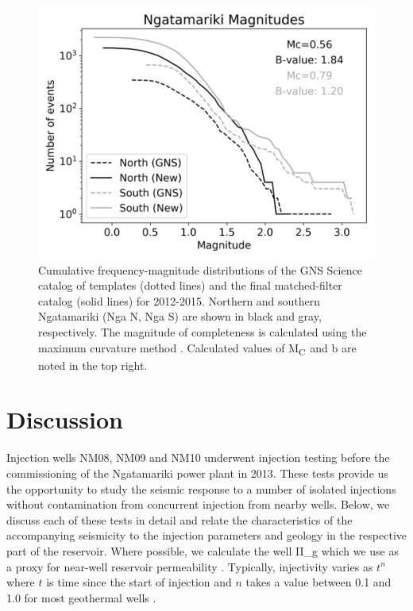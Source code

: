 \begin{figure}[h!]
\begin{center}
\includegraphics[width=0.90\columnwidth]{Chapter_3_Nga/figures/NgaN_min4_SVD1-5_PCA_mags_vs_temps/Nga_cumulative_bval_plots_combined_12-5}
\caption[Catalog frequency-magnitude distributions]{{
Cumulative frequency-magnitude distributions of the GNS Science catalog
of templates (dotted lines) and the final matched-filter catalog (solid
lines) for 2012-2015. Northern and southern Ngatamariki (Nga N, Nga S)
are shown in black and gray, respectively. The magnitude of completeness
is calculated using the maximum curvature method \protect\citep{Wiemer_1997} .
Calculated values of M\textsubscript{C~}and b are noted in the top
right.
{\label{121528}}%
}}
\end{center}
\end{figure}

\section{Discussion}\label{discussion}
Injection wells NM08, NM09 and NM10 underwent injection testing before the commissioning of the Ngatamariki power plant in 2013. These tests provide us the opportunity to study the seismic response to a number of isolated injections without contamination from concurrent injection from nearby wells. Below, we discuss each of these tests in detail and relate the characteristics of the accompanying seismicity to the injection parameters and geology in the respective part of the reservoir. Where possible, we calculate the well \gls{II_g} which we use as a proxy for near-well reservoir \gls{permeability} \citep{Watson_2013}. Typically, \gls{injectivity} varies as $t^{n}$ where $t$ is time since the start of injection and $n$ takes a value between 0.1 and 1.0 for most geothermal wells \citep{Clearwater_2015,grant2013thermal}.


